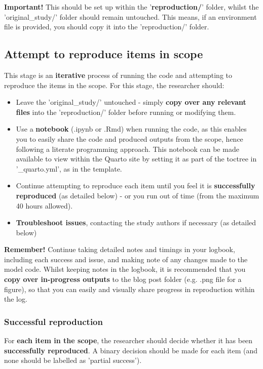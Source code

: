 \textbf{Important!} This should be set up within the '\textbf{reproduction/}' folder, whilst the 'original\_study/' folder should remain untouched. This means, if an environment file is provided, you should copy it into the 'reproduction/' folder.

\vspace{0.5cm}
\subsection{Attempt to reproduce items in scope}

This stage is an \textbf{iterative} process of running the code and attempting to reproduce the items in the scope. For this stage, the researcher should:
\begin{itemize}
    \item Leave the 'original\_study/' untouched - simply \textbf{copy over any relevant files} into the 'reproduction/' folder before running or modifying them.
    \item Use a \textbf{notebook} (.ipynb or .Rmd) when running the code, as this enables you to easily share the code and produced outputs from the scope, hence following a literate programming approach. This notebook can be made available to view within the Quarto site by setting it as part of the toctree in '\_quarto.yml', as in the template.
    \item Continue attempting to reproduce each item until you feel it is \textbf{successfully reproduced} (as detailed below) - or you run out of time (from the maximum 40 hours allowed).
    \item \textbf{Troubleshoot issues}, contacting the study authors if necessary (as detailed below)
\end{itemize}

\textbf{Remember!} Continue taking detailed notes and timings in your logbook, including each success and issue, and making note of any changes made to the model code. Whilst keeping notes in the logbook, it is recommended that you \textbf{copy over in-progress outputs} to the blog post folder (e.g. .png file for a figure), so that you can easily and visually share progress in reproduction within the log.

\newpage
\subsubsection{Successful reproduction}

For \textbf{each item in the scope}, the researcher should decide whether it has been \textbf{successfully reproduced}. A binary decision should be made for each item (and none should be labelled as 'partial success').

